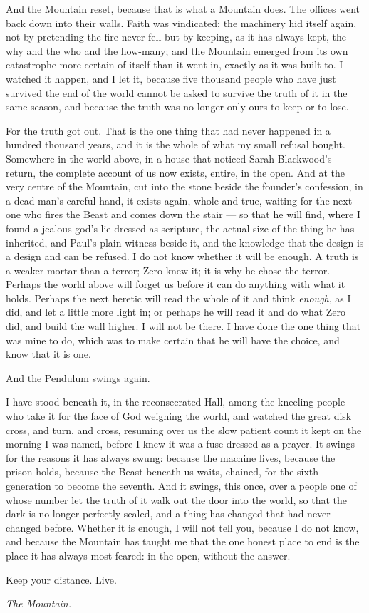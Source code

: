 And the Mountain reset, because that is what a Mountain does. The offices went back down into their walls. Faith was vindicated; the machinery hid itself again, not by pretending the fire never fell but by keeping, as it has always kept, the why and the who and the how-many; and the Mountain emerged from its own catastrophe more certain of itself than it went in, exactly as it was built to. I watched it happen, and I let it, because five thousand people who have just survived the end of the world cannot be asked to survive the truth of it in the same season, and because the truth was no longer only ours to keep or to lose.\par

For the truth got out. That is the one thing that had never happened in a hundred thousand years, and it is the whole of what my small refusal bought. Somewhere in the world above, in a house that noticed Sarah Blackwood's return, the complete account of us now exists, entire, in the open. And at the very centre of the Mountain, cut into the stone beside the founder's confession, in a dead man's careful hand, it exists again, whole and true, waiting for the next one who fires the Beast and comes down the stair --- so that he will find, where I found a jealous god's lie dressed as scripture, the actual size of the thing he has inherited, and Paul's plain witness beside it, and the knowledge that the design is a design and can be refused. I do not know whether it will be enough. A truth is a weaker mortar than a terror; Zero knew it; it is why he chose the terror. Perhaps the world above will forget us before it can do anything with what it holds. Perhaps the next heretic will read the whole of it and think \emph{enough}, as I did, and let a little more light in; or perhaps he will read it and do what Zero did, and build the wall higher. I will not be there. I have done the one thing that was mine to do, which was to make certain that he will have the choice, and know that it is one.\par

And the Pendulum swings again.\par

I have stood beneath it, in the reconsecrated Hall, among the kneeling people who take it for the face of God weighing the world, and watched the great disk cross, and turn, and cross, resuming over us the slow patient count it kept on the morning I was named, before I knew it was a fuse dressed as a prayer. It swings for the reasons it has always swung: because the machine lives, because the prison holds, because the Beast beneath us waits, chained, for the sixth generation to become the seventh. And it swings, this once, over a people one of whose number let the truth of it walk out the door into the world, so that the dark is no longer perfectly sealed, and a thing has changed that had never changed before. Whether it is enough, I will not tell you, because I do not know, and because the Mountain has taught me that the one honest place to end is the place it has always most feared: in the open, without the answer.\par

Keep your distance. Live.\par

\emph{The Mountain.}\par
